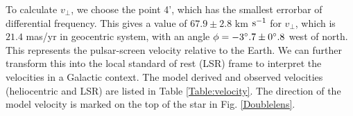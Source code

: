 \documentclass[useAMS,usenatbib]{mn2e}
\begin{document}
To calculate $v_{\bot}$, we choose the point 4', which has the smallest errorbar of differential frequency.
This gives a value of  $67.9\pm 2.8$ km $\rm s^{-1}$ for $v_{\perp}$,  which is $21.4$ mas/yr in geocentric system, with an angle
$\phi=-3\degree.7 \pm 0\degree.8$ west of north. This represents the
pulsar-screen velocity relative to the Earth.  We can further
transform this into the local standard of rest (LSR) frame to
interpret the velocities in a Galactic context.
The model derived and observed velocities (heliocentric and LSR) are listed in Table \ref{Table:velocity}. The
direction of the model velocity is marked on the top of the star in
Fig. \ref{Doublelens}. 

\end{document}
